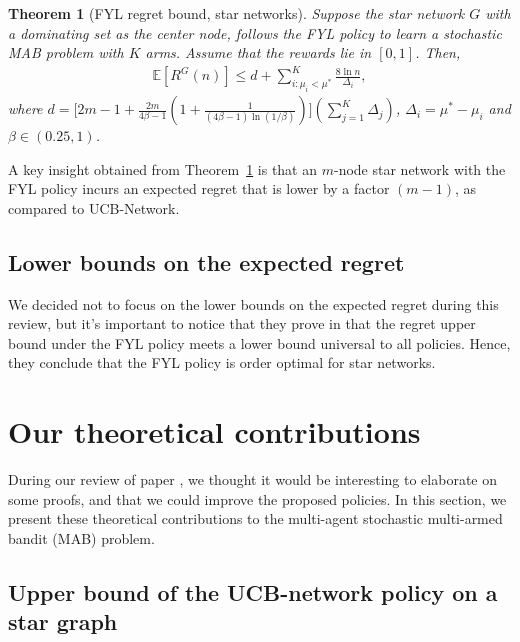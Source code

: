 \documentclass{article}
\newtheorem{theorem}{Theorem}
\begin{document}
\begin{theorem}[FYL regret bound, star networks]
\label{Thm:5.1}
Suppose the star network $G$ with a dominating set as the center node, follows the FYL policy to learn a stochastic MAB problem with $K$ arms. Assume that the rewards lie in $[0,1]$. Then,
\begin{align*}
\mathbb{E}[R^G(n)] \leq d + \sum\limits_{i:\mu_i < \mu^*}^K \frac{8 \ln n}{\Delta_i},
\end{align*}
where $d = \Big[ 2m - 1 + \frac{2 m}{4 \beta -1} \left( 1 + \frac{1}{(4 \beta -1) \ln (1/ \beta)} \right) \Big] \left( \sum\limits_{j=1}^K \Delta_j \right)$, $\Delta_i= \mu^* - \mu_i$ and $\beta \in (0.25,1)$.
\end{theorem}

A key insight obtained from Theorem~\ref{Thm:5.1} is that an $m$-node star network with the FYL policy incurs an expected regret that is lower by a factor $(m - 1)$, as compared to UCB-Network.

\subsection{Lower bounds on the expected regret}

We decided not to focus on the lower bounds on the expected regret during this review, but it's important to notice that they prove in \cite{DBLP:journals/corr/KollaJG16} that the regret upper bound under the FYL policy meets a lower bound universal to all policies. Hence, they conclude that the FYL policy is order optimal for star networks.


\section{Our theoretical contributions}

During our review of paper \cite{DBLP:journals/corr/KollaJG16}, we thought it would be interesting to elaborate on some proofs, and that we could improve the proposed policies. In this section, we present these theoretical contributions to the multi-agent stochastic multi-armed bandit (MAB) problem.

\subsection{Upper bound of the UCB-network policy on a star graph}
\end{document}
